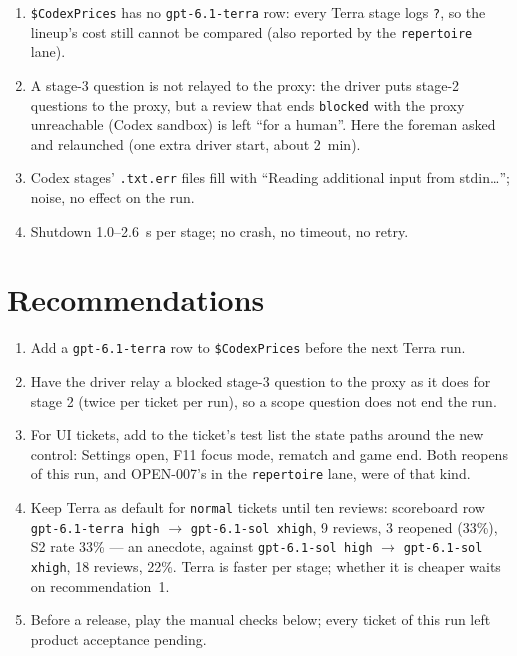 \documentclass[11pt,a4paper]{article}
\begin{document}
\begin{enumerate}
  \item \texttt{\$CodexPrices} has no \texttt{gpt-6.1-terra} row: every Terra stage logs
        \texttt{?}, so the lineup's cost still cannot be compared (also reported by the
        \texttt{repertoire} lane).
  \item A stage-3 question is not relayed to the proxy: the driver puts stage-2 questions to
        the proxy, but a review that ends \texttt{blocked} with the proxy unreachable (Codex
        sandbox) is left ``for a human''. Here the foreman asked and relaunched (one extra
        driver start, about 2~min).
  \item Codex stages' \texttt{.txt.err} files fill with ``Reading additional input from
        stdin\dots''; noise, no effect on the run.
  \item Shutdown 1.0--2.6~s per stage; no crash, no timeout, no retry.
\end{enumerate}

\section*{Recommendations}

\begin{enumerate}
  \item Add a \texttt{gpt-6.1-terra} row to \texttt{\$CodexPrices} before the next Terra run.
  \item Have the driver relay a blocked stage-3 question to the proxy as it does for stage 2
        (twice per ticket per run), so a scope question does not end the run.
  \item For UI tickets, add to the ticket's test list the state paths around the new control:
        Settings open, F11 focus mode, rematch and game end. Both reopens of this run, and
        OPEN-007's in the \texttt{repertoire} lane, were of that kind.
  \item Keep Terra as default for \texttt{normal} tickets until ten reviews: scoreboard row
        \texttt{gpt-6.1-terra high} $\rightarrow$ \texttt{gpt-6.1-sol xhigh}, 9 reviews,
        3 reopened (33\%), S2 rate 33\% --- an anecdote, against \texttt{gpt-6.1-sol high}
        $\rightarrow$ \texttt{gpt-6.1-sol xhigh}, 18 reviews, 22\%. Terra is faster per stage;
        whether it is cheaper waits on recommendation~1.
  \item Before a release, play the manual checks below; every ticket of this run left product
        acceptance pending.
\end{enumerate}
\end{document}
